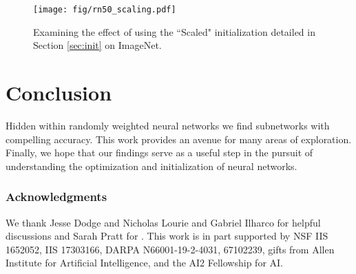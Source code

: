 \documentclass[10pt,twocolumn,letterpaper]{article}
\begin{document}
\begin{figure}[t]
\begin{center}
\texttt{[image: fig/rn50\_scaling.pdf]}
 
\end{center}
  \caption{Examining the effect of using the ``Scaled" initialization detailed in Section \ref{sec:init} on ImageNet.}
\label{fig:rn50_scaling}
\end{figure}
\vspace{-1em}

\section{Conclusion}

Hidden within randomly weighted neural networks we find subnetworks with compelling accuracy. This work provides an avenue for many areas of exploration. Finally, we hope that our findings serve as a useful step in the pursuit of understanding the optimization and initialization of neural networks.
\small{
\subsubsection*{Acknowledgments}
We thank Jesse Dodge and Nicholas Lourie and Gabriel Ilharco for helpful discussions and Sarah Pratt for . This work is in part supported by NSF IIS 1652052, IIS 17303166, DARPA N66001-19-2-4031,  67102239, gifts from  Allen Institute for Artificial Intelligence, and the AI2 Fellowship for AI.
}

{\small


}

\clearpage
 
\end{document}
